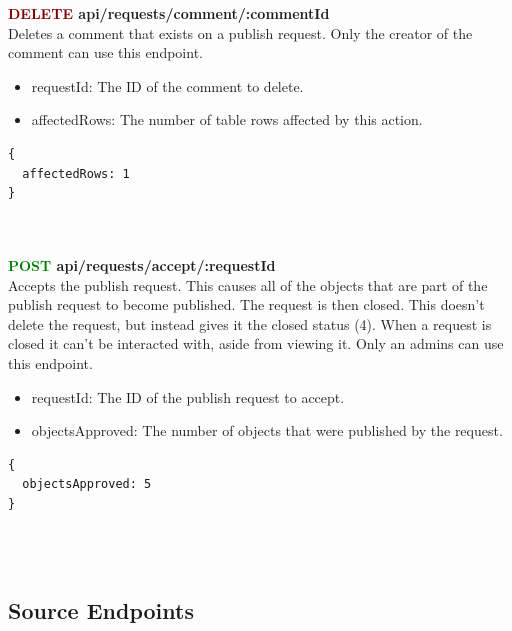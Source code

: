 \documentclass[onecolumn, draftclsnofoot,10pt, compsoc, usenames, dvipsnames]{IEEEtran}
\begin{document}
\noindent
\textbf{\textcolor{Maroon}{DELETE} api/requests/comment/:commentId} \\
Deletes a comment that exists on a publish request. Only the creator of the comment can use this endpoint.
\begin{itemize}
  \item requestId: The ID of the comment to delete.
  \item affectedRows: The number of table rows affected by this action.
\end{itemize}
\begin{lstlisting}[caption=Example Response]
{ 
  affectedRows: 1
}
\end{lstlisting}
\\~\\

\noindent
\textbf{\textcolor{Green}{POST} api/requests/accept/:requestId} \\
Accepts the publish request. This causes all of the objects that are part of the publish request to become published. The request is then closed. This doesn't delete the request, but instead gives it the closed status (4). When a request is closed it can't be interacted with, aside from viewing it. Only an admins can use this endpoint.
\begin{itemize}
    \item requestId: The ID of the publish request to accept.
    \item objectsApproved: The number of objects that were published by the request.
\end{itemize}
\begin{lstlisting}[caption=Example Response]
{ 
  objectsApproved: 5
}
\end{lstlisting}
\\~\\


\subsection{Source Endpoints}
\end{document}

